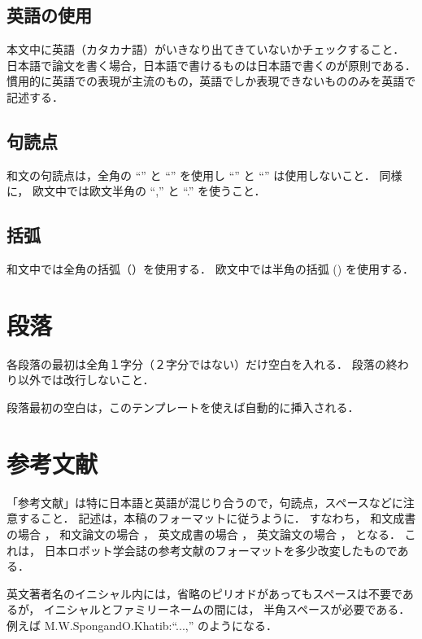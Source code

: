 \subsection{英語の使用}

本文中に英語（カタカナ語）がいきなり出てきていないかチェックすること．
日本語で論文を書く場合，日本語で書けるものは日本語で書くのが原則である．
慣用的に英語での表現が主流のもの，英語でしか表現できないもののみを英語で記述する．


\subsection{句読点}

和文の句読点は，全角の ``'' と ``''
を使用し ``'' と ``'' は使用しないこと．
同様に，
欧文中では欧文半角の ``,'' と ``.'' を使うこと．


\subsection{括弧}

和文中では全角の括弧（）を使用する．
欧文中では半角の括弧 () を使用する．


\section{段落}

各段落の最初は全角１字分（２字分ではない）だけ空白を入れる．
段落の終わり以外では改行しないこと．

段落最初の空白は，このテンプレートを使えば自動的に挿入される．


\section{参考文献}

「参考文献」は特に日本語と英語が混じり合うので，句読点，スペースなどに注意すること．
記述は，本稿のフォーマットに従うように．
すなわち，
和文成書の場合 \Cite{jbook}，
和文論文の場合 \Cite{jpaper}，
英文成書の場合 \Cite{ebook}，
英文論文の場合 \Cite{epaper}，
となる．
これは，
日本ロボット学会誌の参考文献のフォーマットを多少改変したものである．

英文著者名のイニシャル内には，省略のピリオドがあってもスペースは不要であるが，
イニシャルとファミリーネームの間には，
半角スペースが必要である．
例えば M.W.{\textvisiblespace}Spong{\textvisiblespace}and{\textvisiblespace}O.{\textvisiblespace}Khatib:{\textvisiblespace}``...,'' のようになる．

